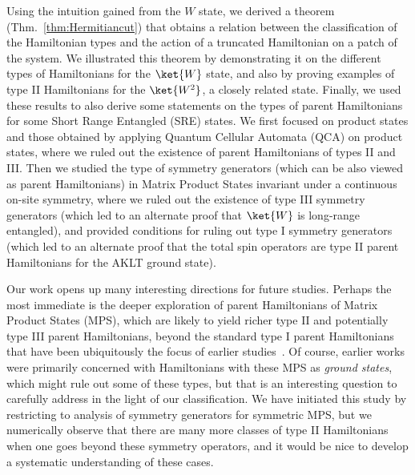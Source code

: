 \documentclass[prx,letterpaper,aps,superscriptaddress,floatfix,twocolumn,nofootinbib]{revtex4-2}
\theoremstyle{definition}
\begin{document}
%
Using the intuition gained from the $W$ state, we derived a theorem (Thm.~\ref{thm:Hermitiancut}) that obtains a relation between the classification of the Hamiltonian types and the action of a truncated Hamiltonian on a patch of the system. 
%
We illustrated this theorem by demonstrating it on the different types of Hamiltonians for the $\ket{W}$ state, and also by proving examples of type II Hamiltonians for the $\ket{W^2}$, a closely related state.
%
Finally, we used these results to also derive some statements on the types of parent Hamiltonians for some Short Range Entangled (SRE) states.
%
We first focused on product states and those obtained by applying Quantum Cellular Automata (QCA) on product states, where we ruled out the existence of parent Hamiltonians of types II and III.
%
Then we studied the type of symmetry generators (which can be also viewed as parent Hamiltonians) in Matrix Product States invariant under a continuous on-site symmetry, where we ruled out the existence of type III symmetry generators (which led to an alternate proof that $\ket{W}$ is long-range entangled), and provided conditions for ruling out type I symmetry generators (which led to an alternate proof that the total spin operators are type II parent Hamiltonians for the AKLT ground state).
%

%
Our work opens up many interesting directions for future studies. 
%
Perhaps the most immediate is the deeper exploration of parent Hamiltonians of Matrix Product States (MPS), which are likely to yield richer type II and potentially type III parent Hamiltonians, beyond the standard type I parent Hamiltonians that have been ubiquitously the focus of earlier studies~\cite{Perez-Garcia2007, PerezGarciaVerstraeteCiracWolf2008}.
%
Of course, earlier works were primarily concerned with Hamiltonians with these MPS as \textit{ground states}, which might rule out some of these types, but that is an interesting question to carefully address in the light of our classification.
%
We have initiated this study by restricting to analysis of symmetry generators for symmetric MPS, but we numerically observe that there are many more classes of type II Hamiltonians when one goes beyond these symmetry operators, and it would be nice to develop a systematic understanding of these cases. 
%
\end{document}
